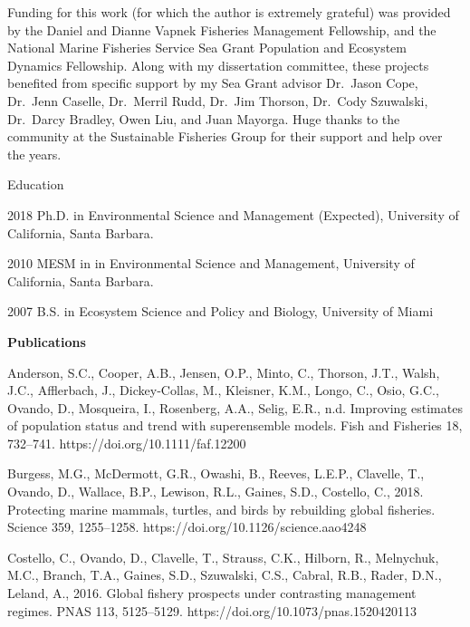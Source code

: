 \documentclass[twoside,12pt,final]{ucthesis-CA2012}
\begin{document}
\begin{ucfrontmatter}
\begin{dedication}
\begin{center}
\begin{Large}
      \end{Large}
      \end{center}
  \end{dedication}
  \begin{acknowledgements}
    Funding for this work (for which the author is extremely grateful) was
    provided by the Daniel and Dianne Vapnek Fisheries Management
    Fellowship, and the National Marine Fisheries Service Sea Grant
    Population and Ecosystem Dynamics Fellowship. Along with my dissertation
    committee, these projects benefited from specific support by my Sea
    Grant advisor Dr.~Jason Cope, Dr.~Jenn Caselle, Dr.~Merril Rudd, Dr.~Jim
    Thorson, Dr.~Cody Szuwalski, Dr.~Darcy Bradley, Owen Liu, and Juan
    Mayorga. Huge thanks to the community at the Sustainable Fisheries Group
    for their support and help over the years.
  \end{acknowledgements}
  \begin{vitae}
    \begin{vitaesection}{Education}
    \vspace{-0.1cm}
    \item [2018]	Ph.D. in Environmental Science and Management (Expected), University of California, Santa Barbara.
    \item [2010]	MESM in in Environmental Science and Management, University of California, Santa Barbara.
    \item [2007]	B.S. in Ecosystem Science and Policy and Biology, University of Miami
    \end{vitaesection}
    \textbf{Publications}

    Anderson, S.C., Cooper, A.B., Jensen, O.P., Minto, C., Thorson, J.T., Walsh, J.C., Afflerbach, J., Dickey‐Collas, M., Kleisner, K.M., Longo, C., Osio, G.C., Ovando, D., Mosqueira, I., Rosenberg, A.A., Selig, E.R., n.d. Improving estimates of population status and trend with superensemble models. Fish and Fisheries 18, 732–741. https://doi.org/10.1111/faf.12200

 Burgess, M.G., McDermott, G.R., Owashi, B., Reeves, L.E.P., Clavelle, T., Ovando, D., Wallace, B.P., Lewison, R.L., Gaines, S.D., Costello, C., 2018. Protecting marine mammals, turtles, and birds by rebuilding global fisheries. Science 359, 1255–1258. https://doi.org/10.1126/science.aao4248

Costello, C., Ovando, D., Clavelle, T., Strauss, C.K., Hilborn, R., Melnychuk, M.C., Branch, T.A., Gaines, S.D., Szuwalski, C.S., Cabral, R.B., Rader, D.N., Leland, A., 2016. Global fishery prospects under contrasting management regimes. PNAS 113, 5125–5129. https://doi.org/10.1073/pnas.1520420113


\end{vitae}
\end{ucfrontmatter}
\end{document}
